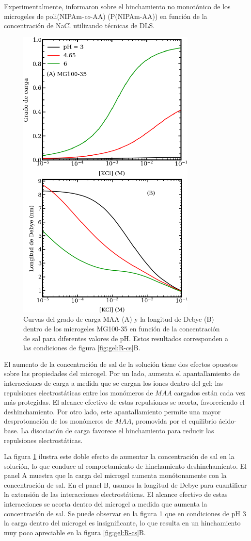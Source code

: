Experimentalmente, \citet{CaprilesGonzalez2008} informaron sobre el hinchamiento no monot\'onico de los microgeles de poli(NIPAm-\emph{co}-AA) (P(NIPAm-AA)) en funci\'on de la concentraci\'on de NaCl utilizando t\'ecnicas de DLS.




\begin{figure}[!tb]
	\centering
	\includegraphics[width=0.40\linewidth]{Figures/graph-gel/f-cs.pdf}
	\caption{Curvas del grado de carga MAA (A) y la longitud de Debye (B) dentro de los microgeles MG100-35 en funci\'on de la concentraci\'on de sal para diferentes valores de pH.
		Estos resultados corresponden a las condiciones de figura \ref{fig:gel:R-cs}B.}
	\label{fig:gel:f-cs}
\end{figure}

El aumento de la concentraci\'on de sal de la soluci\'on tiene dos efectos opuestos sobre las propiedades del microgel. Por un lado, aumenta el apantallamiento de interacciones de carga a medida que se cargan los iones dentro del gel; las repulsiones electrost\'aticas entre los mon\'omeros de $MAA$ cargados est\'an cada vez m\'as protegidas. El alcance efectivo de estas repulsiones se acorta, favoreciendo el deshinchamiento. Por otro lado, este apantallamiento permite una mayor desprotonaci\'on de los mon\'omeros de $MAA$, promovida por el equilibrio \'acido-base. La disociaci\'on de carga favorece el hinchamiento para reducir las repulsiones electrost\'aticas.

La figura \ref{fig:gel:f-cs} ilustra este doble efecto de aumentar la concentraci\'on de sal en la soluci\'on, lo que conduce al comportamiento de hinchamiento-deshinchamiento. El panel A muestra que la carga del microgel aumenta mon\'otonamente con la concentraci\'on de sal. En el panel B, usamos la longitud de Debye para cuantificar la extensi\'on de las interacciones electrost\'aticas. El alcance efectivo de estas interacciones se acorta dentro del microgel a medida que aumenta la concentraci\'on de sal. Se puede observar en la figura \ref{fig:gel:f-cs} que en condiciones de pH 3 la carga dentro del microgel es insignificante, lo que resulta en un hinchamiento muy poco apreciable en la figura \ref{fig:gel:R-cs}B.

